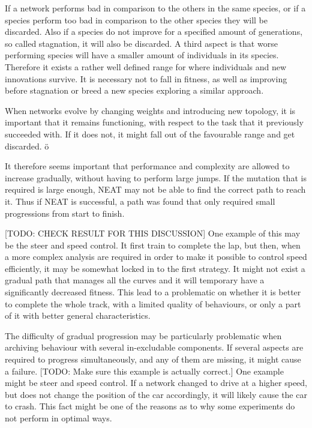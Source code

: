If a network performs bad in comparison to the others in the same species, or if a species perform too bad in comparison to the other species they will be discarded\cite{stanley:neat}. Also if a species do not improve for a specified amount of generations, so called stagnation, it will also be discarded. A third aspect is that worse performing species will have a smaller amount of individuals in its species. Therefore it exists a rather well defined range for where individuals and new innovations survive. It is necessary not to fall in fitness, as well as improving before stagnation or breed a new species exploring a similar approach.

When networks evolve by changing weights and introducing new topology, it is important that it remains functioning, with respect to the task that it previously succeeded with. If it does not, it might fall out of the favourable range and get discarded. ö  


It therefore seems important that performance and complexity are allowed to increase gradually, without having to perform large jumps. If the mutation that is required is large enough, NEAT may not be able to find the correct path to reach it. Thus if NEAT is successful, a path was found that only required small progressions from start to finish.

[TODO: CHECK RESULT FOR THIS DISCUSSION] One example of this may be the steer and speed control. It first train to complete the lap, but then, when a more complex analysis are required in order to make it possible to control speed efficiently, it may be somewhat locked in to the first strategy. It might not exist a gradual path that manages all the curves and it will temporary have a significantly decreased fitness. This lead to a problematic on whether it is better to complete the whole track, with a limited quality of behaviours, or only a part of it with better general characteristics.

The difficulty of gradual progression may be particularly problematic when archiving behaviour with several in-excludable components. If several aspects are required to progress simultaneously, and any of them are missing, it might cause a failure. [TODO: Make sure this example is actually correct.] One example might be steer and speed control. If a network changed to drive at a higher speed, but does not change the position of the car accordingly, it will likely cause the car to crash. This fact might be one of the reasons as to why some experiments do not perform in optimal ways.

